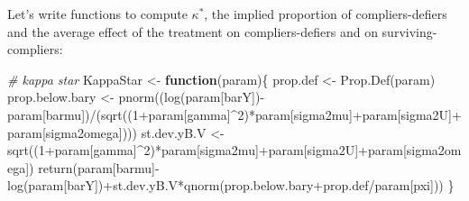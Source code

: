 \documentclass[
]{book}
\newenvironment{Shaded}{\begin{snugshade}}{\end{snugshade}}
\newcommand{\CommentTok}[1]{\textcolor[rgb]{0.56,0.35,0.01}{\textit{#1}}}
\newcommand{\ControlFlowTok}[1]{\textcolor[rgb]{0.13,0.29,0.53}{\textbf{#1}}}
\newcommand{\DecValTok}[1]{\textcolor[rgb]{0.00,0.00,0.81}{#1}}
\newcommand{\FunctionTok}[1]{\textcolor[rgb]{0.00,0.00,0.00}{#1}}
\newcommand{\NormalTok}[1]{#1}
\newcommand{\OtherTok}[1]{\textcolor[rgb]{0.56,0.35,0.01}{#1}}
\newcommand{\SpecialCharTok}[1]{\textcolor[rgb]{0.00,0.00,0.00}{#1}}
\newcommand{\StringTok}[1]{\textcolor[rgb]{0.31,0.60,0.02}{#1}}
\theoremstyle{definition}
\theoremstyle{definition}
\theoremstyle{definition}
\theoremstyle{definition}
\theoremstyle{remark}
\begin{document}
Let's write functions to compute \(\kappa^*\), the implied proportion of compliers-defiers and the average effect of the treatment on compliers-defiers and on surviving-compliers:

\begin{Shaded}
\begin{Highlighting}[]
\CommentTok{\# kappa star}
\NormalTok{KappaStar }\OtherTok{\textless{}{-}} \ControlFlowTok{function}\NormalTok{(param)\{}
\NormalTok{  prop.def }\OtherTok{\textless{}{-}} \FunctionTok{Prop.Def}\NormalTok{(param)}
\NormalTok{  prop.below.bary }\OtherTok{\textless{}{-}} \FunctionTok{pnorm}\NormalTok{((}\FunctionTok{log}\NormalTok{(param[}\StringTok{\textquotesingle{}barY\textquotesingle{}}\NormalTok{])}\SpecialCharTok{{-}}\NormalTok{param[}\StringTok{\textquotesingle{}barmu\textquotesingle{}}\NormalTok{])}\SpecialCharTok{/}\NormalTok{(}\FunctionTok{sqrt}\NormalTok{((}\DecValTok{1}\SpecialCharTok{+}\NormalTok{param[}\StringTok{\textquotesingle{}gamma\textquotesingle{}}\NormalTok{]}\SpecialCharTok{\^{}}\DecValTok{2}\NormalTok{)}\SpecialCharTok{*}\NormalTok{param[}\StringTok{\textquotesingle{}sigma2mu\textquotesingle{}}\NormalTok{]}\SpecialCharTok{+}\NormalTok{param[}\StringTok{\textquotesingle{}sigma2U\textquotesingle{}}\NormalTok{]}\SpecialCharTok{+}\NormalTok{param[}\StringTok{\textquotesingle{}sigma2omega\textquotesingle{}}\NormalTok{])))}
\NormalTok{  st.dev.yB.V }\OtherTok{\textless{}{-}} \FunctionTok{sqrt}\NormalTok{((}\DecValTok{1}\SpecialCharTok{+}\NormalTok{param[}\StringTok{\textquotesingle{}gamma\textquotesingle{}}\NormalTok{]}\SpecialCharTok{\^{}}\DecValTok{2}\NormalTok{)}\SpecialCharTok{*}\NormalTok{param[}\StringTok{\textquotesingle{}sigma2mu\textquotesingle{}}\NormalTok{]}\SpecialCharTok{+}\NormalTok{param[}\StringTok{\textquotesingle{}sigma2U\textquotesingle{}}\NormalTok{]}\SpecialCharTok{+}\NormalTok{param[}\StringTok{\textquotesingle{}sigma2omega\textquotesingle{}}\NormalTok{])}
  \FunctionTok{return}\NormalTok{(param[}\StringTok{\textquotesingle{}barmu\textquotesingle{}}\NormalTok{]}\SpecialCharTok{{-}}\FunctionTok{log}\NormalTok{(param[}\StringTok{\textquotesingle{}barY\textquotesingle{}}\NormalTok{])}\SpecialCharTok{+}\NormalTok{st.dev.yB.V}\SpecialCharTok{*}\FunctionTok{qnorm}\NormalTok{(prop.below.bary}\SpecialCharTok{+}\NormalTok{prop.def}\SpecialCharTok{/}\NormalTok{param[}\StringTok{\textquotesingle{}pxi\textquotesingle{}}\NormalTok{]))}
\NormalTok{\}}


\end{Highlighting}
\end{Shaded}
\end{document}

